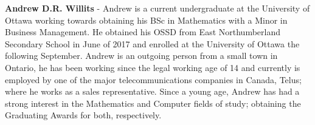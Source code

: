 \textbf{Andrew D.R. Willits} - Andrew is a current undergraduate at the University of Ottawa working towards obtaining his BSc in Mathematics with a Minor in Business Management. He obtained his OSSD from East Northumberland Secondary School in June of 2017 and enrolled at the University of Ottawa the following September. Andrew is an outgoing person from a small town in Ontario, he has been working since the legal working age of 14 and currently is employed by one of the major telecommunications companies in Canada, Telus; where he works as a sales representative. Since a young age, Andrew has had a strong interest in the Mathematics and Computer fields of study; obtaining the Graduating Awards for both, respectively.